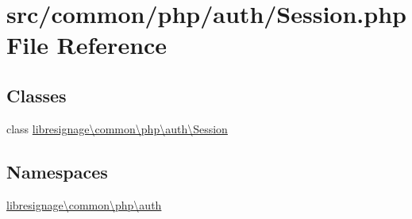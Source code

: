 \hypertarget{Session_8php}{}\section{src/common/php/auth/\+Session.php File Reference}
\label{Session_8php}
\subsection*{Classes}
\begin{DoxyCompactItemize}
\item 
class \hyperlink{classlibresignage_1_1common_1_1php_1_1auth_1_1Session}{libresignage\textbackslash{}common\textbackslash{}php\textbackslash{}auth\textbackslash{}\+Session}
\end{DoxyCompactItemize}
\subsection*{Namespaces}
\begin{DoxyCompactItemize}
\item 
 \hyperlink{namespacelibresignage_1_1common_1_1php_1_1auth}{libresignage\textbackslash{}common\textbackslash{}php\textbackslash{}auth}
\end{DoxyCompactItemize}
